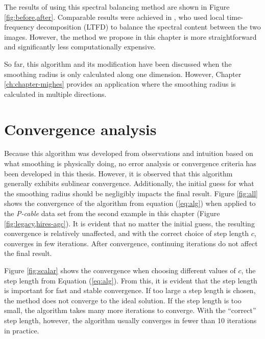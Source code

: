 
        The results of using this spectral balancing method are shown in Figure \ref{fig:before,after}. 
        Comparable results were achieved in \cite{ltft}, who used local time-frequency decomposition (LTFD) to balance the spectral content between the two images. 
        However, the method we propose in this chapter is more straightforward and significantly less computationally expensive.

        So far, this algorithm and its modification have been discussed when the smoothing radius is only calculated along one dimension. 
        However, Chapter \ref{ch:chapter-mighes} provides an application where the smoothing radius is calculated in multiple directions.

        
\section{Convergence analysis}
        Because this algorithm was developed from observations and intuition based on what smoothing is physically doing, no error analysis or convergence criteria has been developed in this thesis.
        However, it is observed that this algorithm generally exhibits sublinear convergence.
        Additionally, the initial guess for what the smoothing radius should be negligibly impacts the final result.
        Figure \ref{fig:all} shows the convergence of the algorithm from equation (\ref{eq:alg}) when applied to the {\em P-cable} data set from the second example in this chapter (Figure \ref{fig:legacy,hires-agc}).
        It is evident that no matter the initial guess, the resulting convergence is relatively unaffected, and with the correct choice of step length $c$, converges in few iterations.
        After convergence, continuing iterations do not affect the final result.

        Figure \ref{fig:scalar} shows the convergence when choosing different values of $c$, the step length from Equation (\ref{eq:alg}).
        From this, it is evident that the step length is important for fast and stable convergence. 
        If too large a step length is chosen, the method does not converge to the ideal solution.
        If the step length is too small, the algorithm takes many more iterations to converge.
        With the ``correct'' step length, however, the algorithm usually converges in fewer than 10 iterations in practice.

